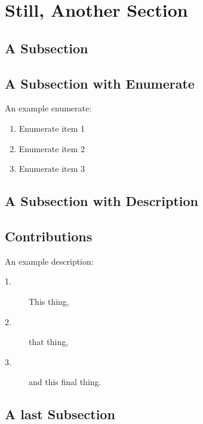 \section{Still, Another Section}
\label{chap:ourModel}

\subsection{A Subsection}

\subsection{A Subsection with Enumerate}

An example enumerate:
\begin{enumerate}
    \item Enumerate item 1
    \item Enumerate item 2
    \item Enumerate item 3
\end{enumerate}

\subsection{A Subsection with Description}

\subsection{Contributions}
An example description:
    \begin{description}
    \item [1.] This thing,
    \item [2.] that thing,
    \item [3.] and this final thing.
\end{description}

\subsection{A last Subsection}
